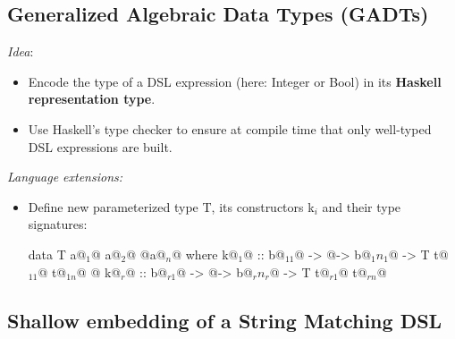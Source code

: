 




\subsection{Generalized Algebraic Data Types (GADTs)}

\textit{Idea}: 
\begin{itemize}
    \item Encode the type of a DSL expression (here: Integer or Bool) in its \textbf{Haskell representation type}.
    \item Use Haskell's type checker to ensure at compile time that only well-typed DSL expressions are built.
\end{itemize}

\textit{Language extensions:}\\
\begin{itemize}
    \item Define new parameterized type T, its constructors k$_i$ and their type signatures:\\
    \begin{Haskell}
data T a@$_1$@ a@$_2$@ @\dots@ a@$_n$@ where
    k@$_1$@ :: b@$_{11}$@ -> @\dots@ -> b@$_1n_1$@ -> T t@$_{11}$@ t@$_{1n}$@
    @\dots@
    k@$_r$@ :: b@$_{r1}$@ -> @\dots@ -> b@$_rn_r$@ -> T t@$_{r1}$@ t@$_{rn}$@
    \end{Haskell}
\end{itemize}





\subsection{Shallow embedding of a String Matching DSL}

